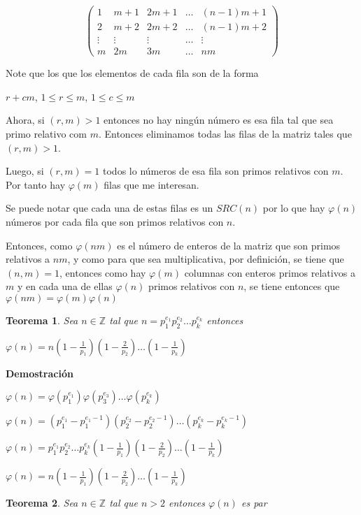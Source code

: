 \documentclass[a4paper,12pt]{report}
\newtheorem*{teo}{Teorema}
\begin{document}
\begin{equation}
\begin{pmatrix}
1 & m+1 & 2m+1& \dots & (n-1)m+1\\
2 & m+2 & 2m+2& \dots & (n-1)m+2\\
\vdots & \vdots & \vdots& \dots & \vdots\\
m & 2m & 3m& \dots & nm
\end{pmatrix}
\end{equation}

Note que los que los elementos de cada fila son de la forma 

$r+cm$, $1\leq r \leq m$, $1\leq c \leq m$

Ahora, si $(r,m)>1$ entonces no hay ningún número es esa fila tal que sea primo relativo com $m$. Entonces eliminamos todas las filas de la matriz tales que $(r,m)>1$.

Luego, si $(r,m)=1$ todos lo números de esa fila son primos relativos con $m$. Por tanto hay $\varphi(m)$ filas que me interesan.

Se puede notar que cada una de estas filas es un $SRC(n)$ por lo que hay $\varphi(n)$ números por cada fila que son primos relativos con $n$.

Entonces, como $\varphi(nm)$ es el número de enteros de la matriz que son primos relativos a $nm$, y como para que sea multiplicativa, por definición, se tiene que $(n,m)=1$, entonces como hay $\varphi(m)$ columnas con enteros primos relativos a $m$ y en cada una de ellas $\varphi(n)$ primos relativos con $n$, se tiene entonces que $\varphi(nm)=\varphi(m)\varphi(n)$

\begin{teo}
 Sea $n\in\mathbb{Z}$ tal que $n=p_1^{e_1}p_2^{e_2}\dots p_k^{e_k}$ entonces 
 
 $\varphi(n)=n(1-\frac{1}{p_1})(1-\frac{2}{p_2})\dots(1-\frac{1}{p_k})$
\end{teo}

\textbf{Demostración}

$\varphi(n)=\varphi(p_1^{e_1})\varphi(p_3^{e_3})\dots\varphi(p_k^{e_k})$

$\varphi(n)=(p_1^{e_1}-p_1^{e_1-1})(p_2^{e_2}-p_2^{e_2-1})\dots(p_k^{e_k}-p_k^{e_k-1})$

$\varphi(n)=p_1^{e_1}p_2^{e_2}\dots p_k^{e_k}(1-\frac{1}{p_1})(1-\frac{2}{p_2})\dots(1-\frac{1}{p_k})$

$\varphi(n)=n(1-\frac{1}{p_1})(1-\frac{2}{p_2})\dots(1-\frac{1}{p_k})$

\begin{teo}
 Sea $n\in\mathbb{Z}$ tal que $n>2$ entonces $\varphi(n)$ es par
\end{teo}
\end{document}
